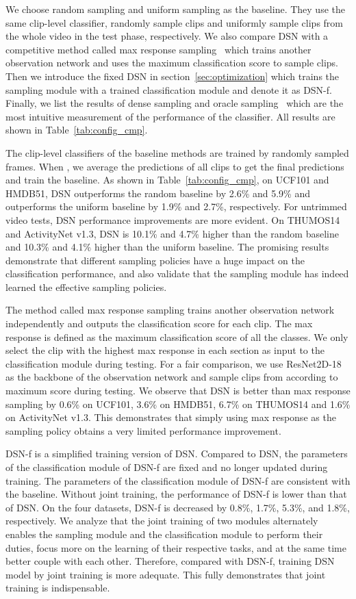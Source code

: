 \documentclass[journal]{IEEEtran}
\begin{document}
We choose random sampling and uniform sampling as the baseline.
They use the same clip-level classifier, randomly sample  clips and uniformly sample  clips from the whole video in the test phase, respectively.
We also compare DSN with a competitive method called max response sampling~\cite{HuangRMTPFN18} which trains another observation network and uses the maximum classification score to sample clips.
Then we introduce the fixed DSN in section~\ref{sec:optimization} which trains the sampling module with a trained classification module and denote it as DSN-f.
Finally, we list the results of dense sampling and oracle sampling~\cite{HuangRMTPFN18} which are the most intuitive measurement of the performance of the classifier.
All results are shown in Table~\ref{tab:config_cmp}.

The clip-level classifiers of the baseline methods are trained by randomly sampled frames.
When , we average the predictions of all clips to get the final predictions and train the baseline.
As shown in Table~\ref{tab:config_cmp}, on UCF101 and HMDB51, DSN outperforms the random baseline  by 2.6\%  and 5.9\% and outperforms the uniform baseline by 1.9\% and 2.7\%, respectively.
For untrimmed video tests, DSN performance improvements are more evident.
On THUMOS14 and ActivityNet v1.3, DSN is 10.1\% and 4.7\% higher than the random baseline and 10.3\% and 4.1\% higher than the uniform baseline.
The promising results demonstrate that different sampling policies have a huge impact on the classification performance, and also validate that the sampling module has indeed learned the effective sampling policies.

The method called max response sampling trains another observation network independently and outputs the classification score for each clip.
The max response is defined as the maximum classification score of all the classes.
We only select the clip with the highest max response in each section as input to the classification module during testing.
For a fair comparison, we use ResNet2D-18 as the backbone of the observation network and sample  clips from  according to maximum score during testing.
We observe that DSN is better than max response sampling by 0.6\% on UCF101, 3.6\% on HMDB51, 6.7\% on THUMOS14 and 1.6\% on ActivityNet v1.3.
This demonstrates that simply using max response as the sampling policy obtains a very limited performance improvement.

DSN-f is a simplified training version of DSN.
Compared to DSN, the parameters of the classification module of DSN-f are fixed and no longer updated during training.
The parameters of the classification module of DSN-f are consistent with the baseline.
Without joint training, the performance of DSN-f is lower than that of DSN.
On the four datasets, DSN-f is decreased by 0.8\%, 1.7\%, 5.3\%, and 1.8\%, respectively.
We analyze that the joint training of two modules alternately enables the sampling module and the classification module to perform their duties, focus more on the learning of their respective tasks, and at the same time better couple with each other.
Therefore, compared with DSN-f, training DSN model by joint training is more adequate.
This fully demonstrates that joint training is indispensable.
\end{document}
